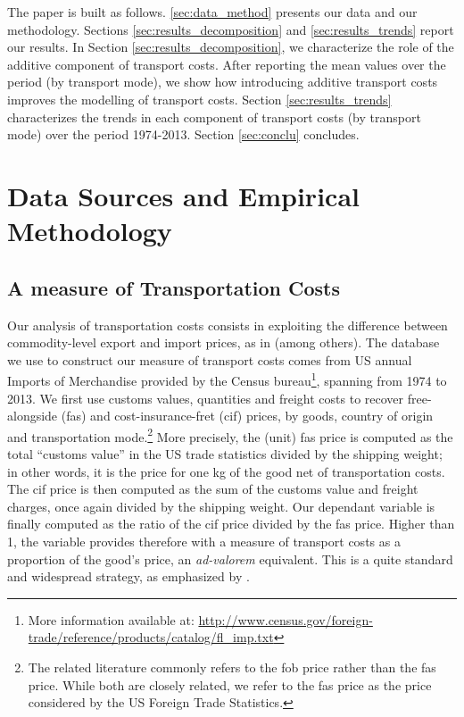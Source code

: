 \documentclass[a4paper,11pt]{article}
\begin{document}
The paper is built as follows. \ref{sec:data_method} presents our data and our  methodology. Sections \ref{sec:results_decomposition} and \ref{sec:results_trends} report our results. In Section \ref{sec:results_decomposition}, we characterize the role of the additive component of transport costs. After reporting the mean values over the period (by transport mode), we show how introducing additive transport costs improves the modelling of transport costs. Section \ref{sec:results_trends} characterizes the trends in each component of transport costs (by transport mode) over the period 1974-2013. Section \ref{sec:conclu} concludes.

\section{Data Sources and Empirical Methodology \label{sec:data_method}}

\subsection{A measure of Transportation Costs}

Our analysis of transportation costs consists in exploiting the difference between commodity-level export and import prices, as in \cite{hummels2007} (among others). The database we use to construct our measure of transport costs comes from US annual Imports of Merchandise provided by the Census bureau\footnote{More information available at: \url{http://www.census.gov/foreign-trade/reference/products/catalog/fl_imp.txt}}, spanning from 1974 to 2013. We first use customs values, quantities and freight costs to recover free-alongside (fas) and cost-insurance-fret (cif) prices, by goods, country of origin and transportation mode.\footnote{The related literature commonly refers to the fob price rather than the fas price. While both are closely related, we refer to the fas price as the price considered by the US Foreign Trade Statistics.} More precisely, the (unit) fas price is computed as the total ``customs value'' in the US trade statistics divided by the shipping weight; in other words, it is the price for one kg of the good net of transportation costs. The cif price is then computed as the sum of the customs value and freight charges, once again divided by the shipping weight. Our dependant variable is finally computed as the ratio of the cif price divided by the fas price. Higher than 1, the variable provides therefore with a measure of transport costs as a proportion of the good's price, an \emph{ad-valorem} equivalent. This is a quite standard and widespread strategy, as emphasized by \citet{anderson_wincoop_jel}.
\end{document}

